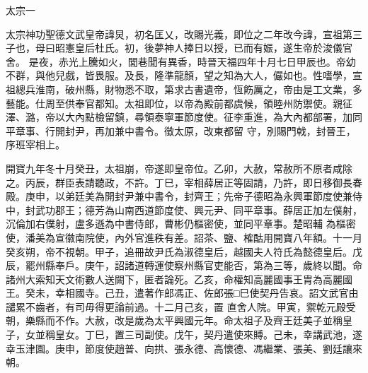 
\begin{pinyinscope}

 太宗一



 太宗神功聖德文武皇帝諱炅，初名匡乂，改賜光義，即位之二年改今諱，宣祖第三子也，母曰昭憲皇后杜氏。初，後夢神人捧日以授，已而有娠，遂生帝於浚儀官舍。
 是夜，赤光上騰如火，閭巷聞有異香，時晉天福四年十月七日甲辰也。帝幼不群，與他兒戲，皆畏服。及長，隆準龍顏，望之知為大人，儼如也。性嗜學，宣祖總兵淮南，破州縣，財物悉不取，第求古書遺帝，恆飭厲之，帝由是工文業，多藝能。仕周至供奉官都知。太祖即位，以帝為殿前都虞候，領睦州防禦使。親征澤、潞，帝以大內點檢留鎮，尋領泰寧軍節度使。征李重進，為大內都部署，加同平章事、行開封尹，再加兼中書令。徵太原，改東都留
 守，別賜門戟，封晉王，序班宰相上。



 開寶九年冬十月癸丑，太祖崩，帝遂即皇帝位。乙卯，大赦，常赦所不原者咸除之。丙辰，群臣表請聽政，不許。丁巳，宰相薛居正等固請，乃許，即日移御長春殿。庚申，以弟廷美為開封尹兼中書令，封齊王；先帝子德昭為永興軍節度使兼侍中，封武功郡王；德芳為山南西道節度使、興元尹、同平章事。薛居正加左僕射，沉倫加右僕射，盧多遜為中書侍郎，曹彬仍樞密使，並同平章事。楚昭輔
 為樞密使，潘美為宣徽南院使，內外官進秩有差。詔茶、鹽、榷酤用開寶八年額。十一月癸亥朔，帝不視朝。甲子，追冊故尹氏為淑德皇后，越國夫人符氏為懿德皇后。戊辰，罷州縣奉戶。庚午，詔諸道轉運使察州縣官吏能否，第為三等，歲終以聞。命諸州大索知天文術數人送闕下，匿者論死。乙亥，命權知高麗國事王胄為高麗國王。癸未，幸相國寺。己丑，遣著作郎馮正、佐郎張□巳使契丹告哀。詔文武官由譴累不齒者，有司毋得更論前過。十二月己亥，置
 直舍人院。甲寅，禦乾元殿受朝，樂縣而不作。大赦，改是歲為太平興國元年。命太祖子及齊王廷美子並稱皇子，女並稱皇女。丁巳，置三司副使。戊午，契丹遣使來賻。己未，幸講武池，遂幸玉津園。庚申，節度使趙普、向拱、張永德、高懷德、馮繼業、張美、劉廷讓來朝。




\end{pinyinscope}
